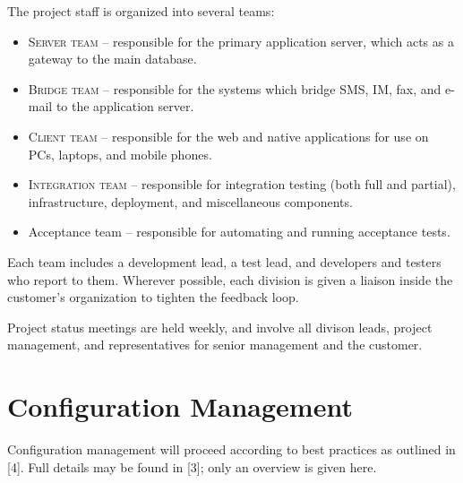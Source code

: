 \documentclass[11pt]{wacomepd}
\begin{document}

The project staff is organized into several teams:

\begin{itemize}
\item \textsc{Server team} -- responsible for the primary application server, which acts as a
  gateway to the main database.
\item \textsc{Bridge team} -- responsible for the systems which bridge SMS, IM, fax, and e-mail to
  the application server.
\item \textsc{Client team} -- responsible for the web and native applications for use on PCs,
  laptops, and mobile phones.
\item \textsc{Integration team} -- responsible for integration testing (both full and partial),
  infrastructure, deployment, and miscellaneous components.
\item {\sc Acceptance team} -- responsible for automating and running acceptance tests.
\end{itemize}

Each team includes a development lead, a test lead, and developers and testers who report to them.
Wherever possible, each division is given a liaison inside the customer's organization to tighten
the feedback loop.

Project status meetings are held weekly, and involve all divison leads, project management, and
representatives for senior management and the customer.


\chapter{Configuration Management}

Configuration management will proceed according to best practices as outlined in [4].  Full details
may be found in [3]; only an overview is given here.
\end{document}
